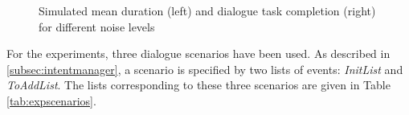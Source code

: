 \begin{figure*}[b!]
\begin{subfigure}[t]{.5\textwidth}
                  \end{subfigure}
                  \caption{Simulated mean duration (left) and dialogue task completion (right) for different noise levels}
                    \label{fig:genstrateval}
              \end{figure*}
              
  		For the experiments, three dialogue scenarios have been used. As described in \ref{subsec:intentmanager}, a scenario is specified by two lists of events: \textit{InitList} and \textit{ToAddList}. The lists corresponding to these three scenarios are given in Table \ref{tab:expscenarios}.

        
